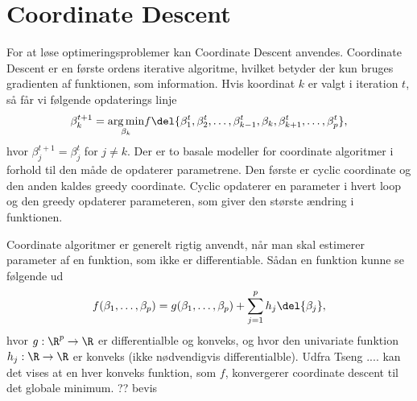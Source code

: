 \section{Coordinate Descent}
For at løse optimeringsproblemer kan Coordinate Descent anvendes. 
Coordinate Descent er en første ordens iterative algoritme, hvilket betyder der kun bruges gradienten af funktionen, som information. 
Hvis koordinat $k$ er valgt i iteration $t$, så får vi følgende opdaterings linje
\begin{align*}
\beta_k^{t+1} =\underset{ \beta_k}{\arg \min}  f\del{ \beta_1^t, \beta_2^t, \dots, \beta_{k-1}^t, \beta_k, \beta_{k+1}^t, \dots, \beta_p^t  },
\end{align*}
hvor $\beta_j^{t+1} = \beta_j^t$ for $j \neq k$. 
Der er to basale modeller for coordinate algoritmer i forhold til den måde de opdaterer parametrene. Den første er cyclic coordinate og den anden kaldes greedy coordinate. 
Cyclic opdaterer en parameter i hvert loop og den greedy opdaterer parameteren, som giver den største ændring i funktionen. 

Coordinate algoritmer er generelt rigtig anvendt, når man skal estimerer parameter af en funktion, som ikke er differentiable. Sådan en funktion kunne se følgende ud
\begin{align*}
f(\beta_1, \dots, \beta_p) = g(\beta_1, \dots, \beta_p) + \sum_{j = 1}^p h_j \del{\beta_j},
\end{align*}
hvor $g: \R^p \rightarrow \R $ er differentialble og konveks, og hvor den univariate funktion $h_j : \R \rightarrow \R$ er konveks (ikke nødvendigvis differentialble). Udfra Tseng .... kan det vises at en hver konveks funktion, som $f$, konvergerer coordinate descent til det globale minimum. 
?? bevis
 


